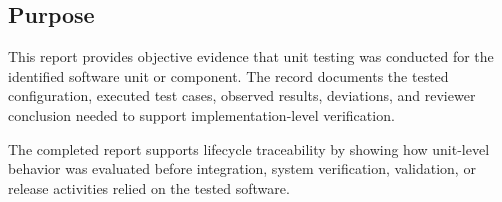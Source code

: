\subsection{Purpose}
This report provides objective evidence that unit testing was conducted for the
identified software unit or component.  The record documents the tested
configuration, executed test cases, observed results, deviations, and reviewer
conclusion needed to support implementation-level verification.

\tlcVspace

The completed report supports lifecycle traceability by showing how unit-level
behavior was evaluated before integration, system verification, validation, or
release activities relied on the tested software.
